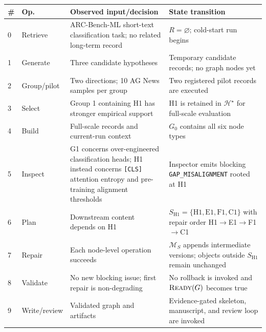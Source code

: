 \vspace*{3.8cm}
\noindent\hspace*{\dimexpr-\columnwidth-\columnsep\relax}%
\begin{minipage}{\textwidth}
  \centering
  \small
  \setlength{\tabcolsep}{2.5pt}
  \begin{tabular}{@{}p{0.45cm}p{1.80cm}p{6.00cm}p{7.70cm}@{}}
    \toprule
    \textbf{\#} & \textbf{Op.} & \textbf{Observed input/decision} &
    \textbf{State transition} \\
    \midrule
    0 & Retrieve & ARC-Bench-ML short-text classification task; no related
    long-term record & $R=\varnothing$; cold-start run begins \\
    1 & Generate & Three candidate hypotheses & Temporary candidate records;
    no graph nodes yet \\
    2 & Group/\allowbreak pilot & Two directions; 10 AG News samples per group & Two
    registered pilot records are executed \\
    3 & Select & Group 1 containing H1 has stronger empirical support & H1 is
    retained in $\mathcal{H}^{\star}$ for full-scale evaluation \\
    4 & Build & Full-scale records and current-run context & $G_0$ contains all
    six node types \\
    5 & Inspect & G1 concerns over-engineered classification heads; H1 instead
    concerns \texttt{[CLS]} attention entropy and pre-training alignment
    thresholds & Inspector emits blocking \texttt{GAP\_}\allowbreak\texttt{MISALIGNMENT} rooted at
    H1 \\
    6 & Plan & Downstream content depends on H1 &
    $S_{\mathrm{H1}}=\{\mathrm{H1,E1,F1,C1}\}$ with repair order
    H1$\rightarrow$E1$\rightarrow$F1$\rightarrow$C1 \\
    7 & Repair & Each node-level operation succeeds & $\mathcal{M}_S$ appends
    intermediate versions; objects outside $S_{\mathrm{H1}}$ remain unchanged \\
    8 & Validate & No new blocking issue; first repair is non-degrading & No
    rollback is invoked and $\textsc{Ready}(G)$ becomes true \\
    9 & Write/\allowbreak review & Validated graph and artifacts & Evidence-gated skeleton,
    manuscript, and review loop are invoked \\
    \bottomrule
  \end{tabular}
  \label{tab:expanded-trace}
\end{minipage}

\clearpage
\finishAppendixDocument
